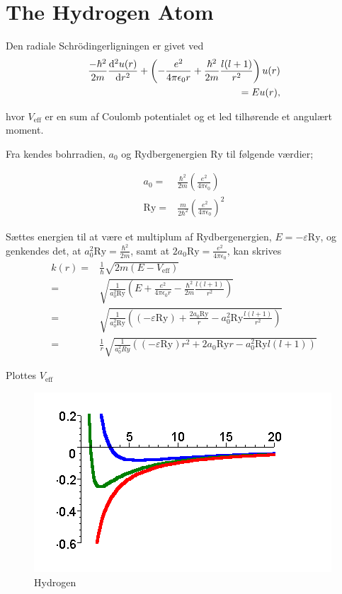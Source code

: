 \section{The Hydrogen Atom}
Den radiale Schrödingerligningen er givet ved\cite{griffiths}
%
\begin{align}
    \frac{-\hbar^{2}}{2m}\diff[2]{u(r)}{r} + \left( - \frac{e^{2}}{4\pi\epsilon_{0}r} + \frac{\hbar^{2}}{2m}\frac{l(l+1)}{r^{2}} \right)u(r) & \nonumber \\
    = Eu(r), & 
    \label{eq:schroedinger3d}
\end{align}

hvor $V_{\text{eff}}$ er en sum af Coulomb potentialet og et led tilhørende et angulært moment.

Fra \cite{griffiths} kendes bohrradien, $a_{0}$ og Rydbergenergien $\mathrm{Ry}$ til følgende værdier;

\begin{align}
    a_{0} = & \frac{\hbar^{2}}{2m}\left( \frac{e^{2}}{4\pi\epsilon_{0}} \right) \\
\mathrm{Ry} = & \frac{m}{2\hbar^{2}}\left( \frac{e^{2}}{4\pi\epsilon_0} \right)^{2}
\label{eq:konstanter}
\end{align} 

Sættes energien til at være et multiplum af Rydbergenergien, $E = -\varepsilon \mathrm{Ry}$, og genkendes det, at $a_{0}^{2}\mathrm{Ry} = \frac{\hbar^{2}}{2m}$, samt at $2a_{0}\mathrm{Ry} = \frac{e^{2}}{4\pi\epsilon_{0}}$, kan  skrives
\begin{align}
    k(r) = & \frac{1}{\hbar} \sqrt{2m\left( E - V_{\text{eff}} \right)}\\ 
    = & \sqrt{\frac{1}{a_{0}^{2}\mathrm{\mathrm{Ry}}} \left( E + \frac{e^{2}}{4\pi\epsilon_{0}r} - \frac{\hbar^{2}}{2m}\frac{l(l+1)}{r^{2}} \right)}\\
    = & \sqrt{\frac{1}{a_{0}^{2}\mathrm{Ry}} \left( (-\varepsilon \mathrm{Ry}) + \frac{2a_{0}\mathrm{Ry}}{r} - a_{0}^{2}\mathrm{Ry}\frac{l(l+1)}{r^{2}} \right)}\\
    = & \frac{1}{r} \sqrt{\frac{1}{a_{0}^{2}{Ry}} \left( (-\varepsilon \mathrm{Ry})r^{2} + 2a_{0}\mathrm{Ry} r - a_{0}^{2}\mathrm{Ry} l(l+1) \right)}
\end{align}

Plottes $V_{\text{eff}}$

\begin{figure}[h!]
    \centering
    \includegraphics[width=\columnwidth]{hydrogen}
    \caption{Hydrogen}
    \label{fig:hydrogen}
\end{figure}


%
